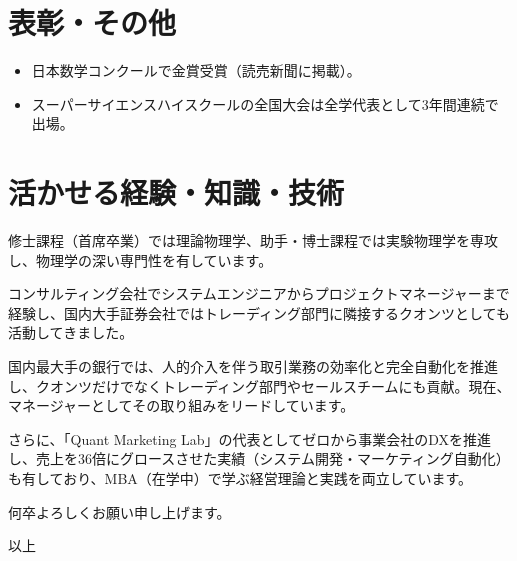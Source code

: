 \documentclass[uplatex,a4j,10.5pt,dvipdfmx]{jsarticle}
\begin{document}
\newpage

\section{表彰・その他}
\begin{itemize}[leftmargin=*]
	\item 日本数学コンクールで金賞受賞（読売新聞に掲載）。
	\item スーパーサイエンスハイスクールの全国大会は全学代表として3年間連続で出場。
\end{itemize}

\section{活かせる経験・知識・技術}

修士課程（首席卒業）では理論物理学、助手・博士課程では実験物理学を専攻し、物理学の深い専門性を有しています。

コンサルティング会社でシステムエンジニアからプロジェクトマネージャーまで経験し、国内大手証券会社ではトレーディング部門に隣接するクオンツとしても活動してきました。

国内最大手の銀行では、人的介入を伴う取引業務の効率化と完全自動化を推進し、クオンツだけでなくトレーディング部門やセールスチームにも貢献。現在、マネージャーとしてその取り組みをリードしています。

さらに、「Quant Marketing Lab」の代表としてゼロから事業会社のDXを推進し、売上を36倍にグロースさせた実績（システム開発・マーケティング自動化）も有しており、MBA（在学中）で学ぶ経営理論と実践を両立しています。

\vspace{1\baselineskip}
何卒よろしくお願い申し上げます。

\vspace{1\baselineskip}
\hfill 以上
\end{document}
